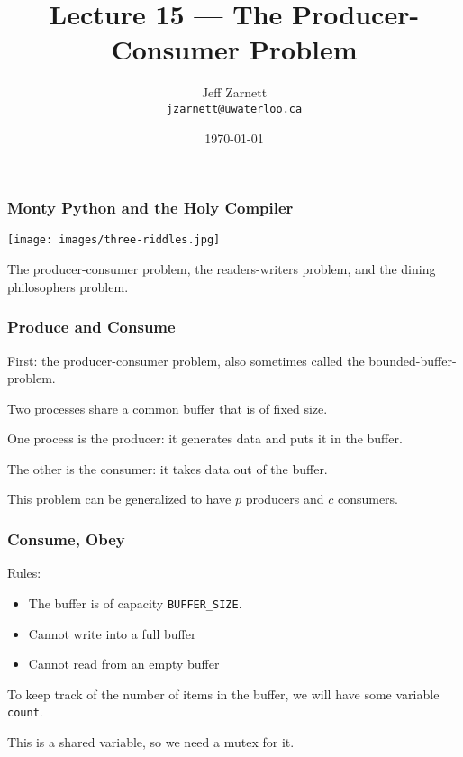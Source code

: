 

\title{Lecture 15 --- The Producer-Consumer Problem }

\author{Jeff Zarnett \\ \small \texttt{jzarnett@uwaterloo.ca}}
\date{\today}




\begin{frame}
	\titlepage

\end{frame}


\begin{frame}
	\frametitle{Monty Python and the Holy Compiler}

	\begin{center}
		\texttt{[image: images/three-riddles.jpg]}
	\end{center}

	The producer-consumer problem, the readers-writers problem, and the dining philosophers problem.

\end{frame}


\begin{frame}
	\frametitle{Produce and Consume}

	First: the producer-consumer problem, also sometimes called the bounded-buffer-problem.

	Two processes share a common buffer that is of fixed size.

	One process is the producer: it generates data and puts it in the buffer.

	The other is the consumer: it takes data out of the buffer.

	This problem can be generalized to have $p$ producers and $c$ consumers.

\end{frame}

\begin{frame}
	\frametitle{Consume, Obey}

	Rules:
	\begin{itemize}
		\item The buffer is of capacity \texttt{BUFFER\_SIZE}.
		\item Cannot write into a full buffer
		\item Cannot read from an empty buffer
	\end{itemize}

	To keep track of the number of items in the buffer, we will have some variable \texttt{count}.

	This is a shared variable, so we need a mutex for it.

\end{frame}


